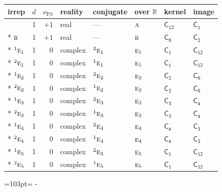 \documentclass[10pt,a4paper]{article}
\newcommand{\needspace}[1]{\par\penalty-100\begingroup\dimen0=#1\relax\dimen2=\pagegoal
  \advance\dimen2-\pagetotal\ifdim\dimen0>\dimen2\relax\ifdim\dimen2>0pt\vfil\break\fi\fi
  \endgroup}
\numberwithin{equation}{section}
\newcommand{\grp}[1]{\mathsf{#1}}
\newcommand{\irr}[1]{\text{\normalfont\scshape #1}}
\newcommand{\conjpair}[1]{{}^{#1}}
\newcommand{\detbox}[1]{{\setlength{\fboxsep}{1pt}\fbox{#1}}}
\newcommand{\fsind}{\nu_{\mathrm{FS}}}
\begin{document}
{\small\renewcommand{\arraystretch}{1.25}\setlength{\tabcolsep}{4pt}\begin{longtable}{@{}lrrlllll@{}}\toprule
irrep & $d$ & $\fsind$ & reality & conjugate & over $\mathbb{R}$ & kernel & image\\\midrule\endhead
\bottomrule\endfoot\endlastfoot
\detbox{$\irr{a}$} & 1 & $+1$ & real & --- & $\irr{a}$ & \href{C12.pdf}{$\grp{C_{12}}$} & \href{C1.pdf}{$\grp{C_{1}}$}\\*
$\irr{b}$ & 1 & $+1$ & real & --- & $\irr{b}$ & \href{C6.pdf}{$\grp{C_{6}}$} & \href{C2.pdf}{$\grp{C_{2}}$}\\*
$\conjpair{1}\irr{e}_{1}$ & 1 & $0$ & complex & $\conjpair{2}\irr{e}_{1}$ & $\irr{e}_{1}$ & \href{C1.pdf}{$\grp{C_{1}}$} & \href{C12.pdf}{$\grp{C_{12}}$}\\*
$\conjpair{2}\irr{e}_{1}$ & 1 & $0$ & complex & $\conjpair{1}\irr{e}_{1}$ & $\irr{e}_{1}$ & \href{C1.pdf}{$\grp{C_{1}}$} & \href{C12.pdf}{$\grp{C_{12}}$}\\*
$\conjpair{1}\irr{e}_{2}$ & 1 & $0$ & complex & $\conjpair{2}\irr{e}_{2}$ & $\irr{e}_{2}$ & \href{C2.pdf}{$\grp{C_{2}}$} & \href{C6.pdf}{$\grp{C_{6}}$}\\*
$\conjpair{2}\irr{e}_{2}$ & 1 & $0$ & complex & $\conjpair{1}\irr{e}_{2}$ & $\irr{e}_{2}$ & \href{C2.pdf}{$\grp{C_{2}}$} & \href{C6.pdf}{$\grp{C_{6}}$}\\*
$\conjpair{1}\irr{e}_{3}$ & 1 & $0$ & complex & $\conjpair{2}\irr{e}_{3}$ & $\irr{e}_{3}$ & \href{C3.pdf}{$\grp{C_{3}}$} & \href{C4.pdf}{$\grp{C_{4}}$}\\*
$\conjpair{2}\irr{e}_{3}$ & 1 & $0$ & complex & $\conjpair{1}\irr{e}_{3}$ & $\irr{e}_{3}$ & \href{C3.pdf}{$\grp{C_{3}}$} & \href{C4.pdf}{$\grp{C_{4}}$}\\*
$\conjpair{1}\irr{e}_{4}$ & 1 & $0$ & complex & $\conjpair{2}\irr{e}_{4}$ & $\irr{e}_{4}$ & \href{C4.pdf}{$\grp{C_{4}}$} & \href{C3.pdf}{$\grp{C_{3}}$}\\*
$\conjpair{2}\irr{e}_{4}$ & 1 & $0$ & complex & $\conjpair{1}\irr{e}_{4}$ & $\irr{e}_{4}$ & \href{C4.pdf}{$\grp{C_{4}}$} & \href{C3.pdf}{$\grp{C_{3}}$}\\*
$\conjpair{1}\irr{e}_{5}$ & 1 & $0$ & complex & $\conjpair{2}\irr{e}_{5}$ & $\irr{e}_{5}$ & \href{C1.pdf}{$\grp{C_{1}}$} & \href{C12.pdf}{$\grp{C_{12}}$}\\*
$\conjpair{2}\irr{e}_{5}$ & 1 & $0$ & complex & $\conjpair{1}\irr{e}_{5}$ & $\irr{e}_{5}$ & \href{C1.pdf}{$\grp{C_{1}}$} & \href{C12.pdf}{$\grp{C_{12}}$}\\
\bottomrule\end{longtable}}
\needspace{103pt}
\end{document}
